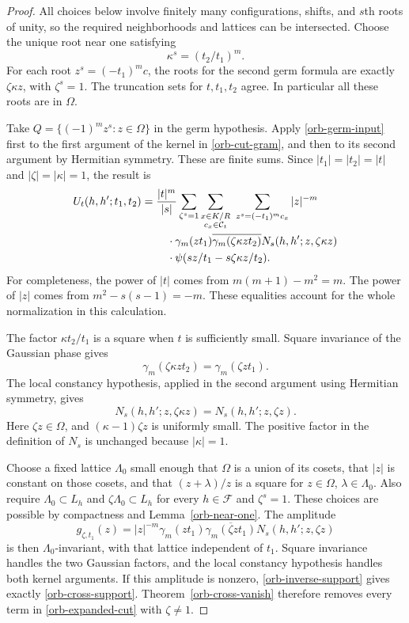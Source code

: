 \begin{proof}
All choices below involve finitely many configurations, shifts,
and $s$th roots of unity, so the required neighborhoods and lattices
can be intersected.  Choose the unique root near one satisfying
\[
 \kappa^s=(t_2/t_1)^m.
\]
For each root $z^s=(-t_1)^mc$, the roots for the second germ
formula are exactly $\zeta\kappa z$, with $\zeta^s=1$.
The truncation sets for $t,t_1,t_2$ agree.  In particular all these roots
are in $\Omega$.

Take
$Q=\{(-1)^m z^s:z\in\Omega\}$ in the germ hypothesis.
Apply \eqref{orb-germ-input} first to the first argument of the
kernel in \eqref{orb-cut-gram}, and then to its second argument
by Hermitian symmetry.  These are finite sums.  Since
$|t_1|=|t_2|=|t|$ and $|\zeta|=|\kappa|=1$, the result is
\begin{align}\label{orb-expanded-cut}
 U_t(h,h';t_1,t_2)
 ={}&\frac{|t|^m}{|s|}
 \sum_{\zeta^s=1}
 \sum_{\substack{x\in K/R\cr c_x\in\mathcal C_t}}
 \ \sum_{z^s=(-t_1)^m c_x}
 |z|^{-m}\notag\\
 &\quad\cdot\gamma_m(zt_1)
       \overline{\gamma_m(\zeta\kappa zt_2)}
       N_s(h,h';z,\zeta\kappa z)\notag\\
 &\quad\cdot\psi(sz/t_1-s\zeta\kappa z/t_2).
\end{align}
For completeness, the power of $|t|$ comes from
$m(m+1)-m^2=m$.  The power of $|z|$ comes from
$m^2-s(s-1)=-m$.  These equalities account for the whole
normalization in this calculation.

The factor $\kappa t_2/t_1$ is a square when $t$ is sufficiently
small.  Square invariance of the Gaussian phase gives
\[
 \gamma_m(\zeta\kappa zt_2)=\gamma_m(\zeta zt_1).
\]
The local constancy hypothesis, applied in the second argument
using Hermitian symmetry, gives
\[
 N_s(h,h';z,\zeta\kappa z)=N_s(h,h';z,\zeta z).
\]
Here $\zeta z\in\Omega$, and
$(\kappa-1)\zeta z$ is uniformly small.  The positive factor in
the definition of $N_s$ is unchanged because $|\kappa|=1$.

Choose a fixed lattice $\Lambda_0$ small enough that $\Omega$
is a union of its cosets, that $|z|$ is constant on those cosets,
and that $(z+\lambda)/z$ is a square for
$z\in\Omega$, $\lambda\in\Lambda_0$.  Also require
$\Lambda_0\subset L_h$ and $\zeta\Lambda_0\subset L_h$
for every $h\in\mathcal F$ and $\zeta^s=1$.
These choices are possible by compactness and
Lemma~\ref{orb-near-one}.  The amplitude
\[
 g_{\zeta,t_1}(z)=|z|^{-m}\gamma_m(zt_1)
           \overline{\gamma_m(\zeta zt_1)}
                       N_s(h,h';z,\zeta z)
\]
is then $\Lambda_0$-invariant, with that lattice independent of
$t_1$.  Square invariance handles the two Gaussian factors, and
the local constancy hypothesis handles both kernel arguments.
If this amplitude is nonzero, \eqref{orb-inverse-support}
gives exactly \eqref{orb-cross-support}.
Theorem~\ref{orb-cross-vanish} therefore removes every term in
\eqref{orb-expanded-cut} with $\zeta\ne1$.


\end{proof}
